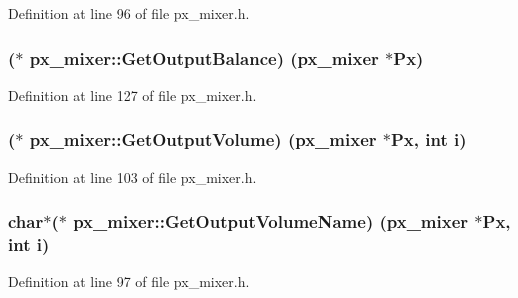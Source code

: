 Definition at line 96 of file px\+\_\+mixer.\+h.

\subsubsection[{\texorpdfstring{Get\+Output\+Balance}{GetOutputBalance}}]{($\ast$ px\+\_\+mixer\+::\+Get\+Output\+Balance) ({\bf px\+\_\+mixer} $\ast$Px)}\hypertarget{structpx__mixer_ad69982cade1ae000bdf80899559529f6}{}\label{structpx__mixer_ad69982cade1ae000bdf80899559529f6}


Definition at line 127 of file px\+\_\+mixer.\+h.

\subsubsection[{\texorpdfstring{Get\+Output\+Volume}{GetOutputVolume}}]{($\ast$ px\+\_\+mixer\+::\+Get\+Output\+Volume) ({\bf px\+\_\+mixer} $\ast$Px, {\bf int} {\bf i})}\hypertarget{structpx__mixer_aaea860e8f0bbe29cf17c938a547896de}{}\label{structpx__mixer_aaea860e8f0bbe29cf17c938a547896de}


Definition at line 103 of file px\+\_\+mixer.\+h.

\subsubsection[{\texorpdfstring{Get\+Output\+Volume\+Name}{GetOutputVolumeName}}]{ char$\ast$($\ast$ px\+\_\+mixer\+::\+Get\+Output\+Volume\+Name) ({\bf px\+\_\+mixer} $\ast$Px, {\bf int} {\bf i})}\hypertarget{structpx__mixer_aa5f16a5a9937741160fd74034d93a41e}{}\label{structpx__mixer_aa5f16a5a9937741160fd74034d93a41e}


Definition at line 97 of file px\+\_\+mixer.\+h.

